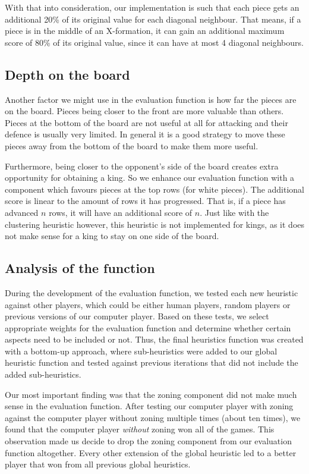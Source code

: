 \documentclass[10pt,a4paper]{article}
\begin{document}
With that into consideration, our implementation is such that each piece gets an additional 20\% of its original value for each diagonal neighbour. That means, if a piece is in the middle of an X-formation, it can gain an additional maximum score of 80\% of its original value, since it can have at most 4 diagonal neighbours.

\subsection{Depth on the board}
Another factor we might use in the evaluation function is how far the pieces are on the board. Pieces being closer to the front are more valuable than others. Pieces at the bottom of the board are not useful at all for attacking and their defence is usually very limited. In general it is a good strategy to move these pieces away from the bottom of the board to make them more useful.

Furthermore, being closer to the opponent's side of the board creates extra opportunity for obtaining a king. So we enhance our evaluation function with a component which favours pieces at the top rows (for white pieces). The additional score is linear to the amount of rows it has progressed. That is, if a piece has advanced $n$ rows, it will have an additional score of $n$. Just like with the clustering heuristic however, this heuristic is not implemented for kings, as it does not make sense for a king to stay on one side of the board.

\subsection{Analysis of the function}
During the development of the evaluation function, we tested each new heuristic against other players, which could be either human players, random players or previous  versions of our computer player. Based on these tests, we select appropriate weights for the evaluation function and determine whether certain aspects need to be included or not. Thus, the final heuristics function was created with a bottom-up approach, where sub-heuristics were added to our global heuristic function and tested against previous iterations that did not include the added sub-heuristics.

Our most important finding was that the zoning component did not make much sense in the evaluation function. After testing our computer player with zoning against the computer player without zoning multiple times (about ten times), we found that the computer player \emph{without} zoning won all of the games. This observation made us decide to drop the zoning component from our evaluation function altogether. Every other extension of the global heuristic led to a better player that won from all previous global heuristics.
\end{document}
